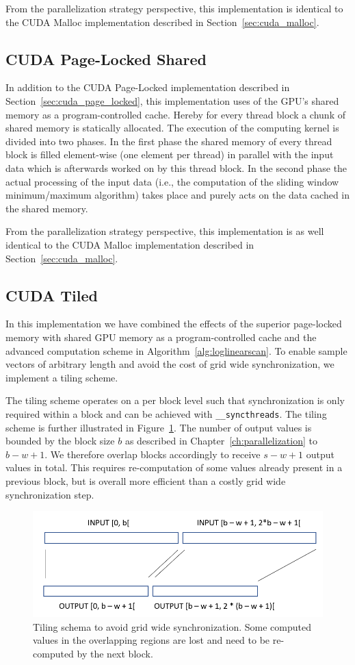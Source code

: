 From the parallelization strategy perspective, this implementation is identical to the CUDA Malloc implementation described in Section~\ref{sec:cuda_malloc}.

\subsection{CUDA Page-Locked Shared}
In addition to the CUDA Page-Locked implementation described in Section~\ref{sec:cuda_page_locked}, this implementation uses of the GPU's shared memory as a program-controlled cache. Hereby for every thread block a chunk of shared memory is statically allocated. The execution of the computing kernel is divided into two phases. In the first phase the shared memory of every thread block is filled element-wise (one element per thread) in parallel with the input data which is afterwards worked on by this thread block. In the second phase the actual processing of the input data (i.e., the computation of the sliding window minimum/maximum algorithm) takes place and purely acts on the data cached in the shared memory.

From the parallelization strategy perspective, this implementation is as well identical to the CUDA Malloc implementation described in Section~\ref{sec:cuda_malloc}.

\subsection{CUDA Tiled}
In this implementation we have combined the effects of the superior page-locked memory with shared GPU memory as a program-controlled cache and the advanced computation scheme in Algorithm~\ref{alg:loglinearscan}. To enable sample vectors of arbitrary length and avoid the cost of grid wide synchronization, we implement a tiling scheme.

The tiling scheme operates on a per block level such that synchronization is only required within a block and can be achieved with \texttt{\_\_syncthreads}. The tiling scheme is further illustrated in Figure~\ref{fig:tiled}. The number of output values is bounded by the block size $b$ as described in Chapter~\ref{ch:parallelization} to $b - w + 1$. We therefore overlap blocks accordingly to receive $s - w + 1$ output values in total. This requires re-computation of some values already present in a previous block, but is overall more efficient than a costly grid wide synchronization step.

\begin{figure} [h]
    \centering
    \includegraphics[width=0.8\linewidth]{Figures/tiling}
    \caption{Tiling schema to avoid grid wide synchronization. Some computed values in the overlapping regions are lost and need to be re-computed by the next block.}
    \label{fig:tiled}
\end{figure}
